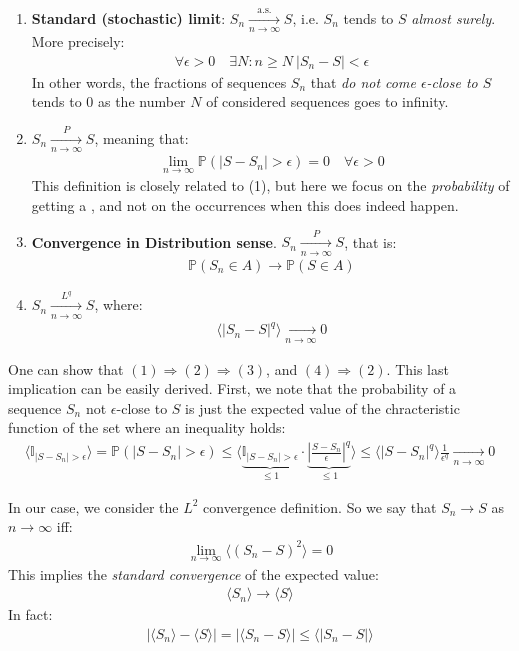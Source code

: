 \documentclass[../template.tex]{subfiles}
\begin{document}
\begin{enumerate}
    \item \textbf{Standard (stochastic) limit}: $S_n  \xrightarrow[n \to \infty]{\mathrm{a.s.}}  S$, i.e. $S_n$ tends to $S$ \textit{almost surely}. More precisely:
    \begin{align*}
        \forall \epsilon > 0\quad \exists N \colon n \geq N \> |S_n - S| < \epsilon    
    \end{align*}     
    In other words, the fractions of sequences $S_n$ that \textit{do not come $\epsilon$-close to $S$} tends to $0$ as the number $N$ of considered sequences goes to infinity.
    \item $S_n  \xrightarrow[n \to \infty]{P} S$, meaning that:
    \begin{align*}
        \lim_{n \to \infty} \mathbb{P}(|S-S_n| > \epsilon) = 0 \quad \forall \epsilon > 0
    \end{align*}
    This definition is closely related to (1), but here we focus on the \textit{probability} of getting a , and not on the occurrences when this does indeed happen.
    \item \textbf{Convergence in Distribution sense}. $S_n  \xrightarrow[n \to \infty]{P}  S$, that is:
    \begin{align*}
        \mathbb{P}(S_n \in A) \to \mathbb{P}(S \in A)    
    \end{align*}  
    \item $S_n  \xrightarrow[n \to \infty]{L^q} S$, where:
    \begin{align*}
        \langle |S_n - S |^q \rangle  \xrightarrow[n \to \infty]{}  0
    \end{align*}       
\end{enumerate}
One can show that $(1) \Rightarrow (2) \Rightarrow (3)$, and $(4) \Rightarrow (2)$. This last implication can be easily derived. First, we note that the probability of a sequence $S_n$ not $\epsilon$-close to $S$ is just the expected value of the chracteristic function of the set where an inequality holds:
\begin{align*}
    \langle \mathbb{I}_{|S-S_n| > \epsilon} \rangle = \mathbb{P}(|S-S_n| > \epsilon) \leq \langle \underbrace{\mathbb{I}_{|S-S_n|>\epsilon}}_{\leq 1}  \cdot \underbrace{\left|\frac{S-S_n}{\epsilon}  \right|^q}_{\leq 1}  \rangle \leq \langle |S-S_n|^q \rangle \frac{1}{\epsilon^q}  \xrightarrow[n \to \infty]{} 0   
\end{align*}     

In our case, we consider the $L^2$ convergence definition. So we say that $S_n \to S$ as $n \to \infty$ iff:
\begin{align*}
    \lim_{n \to \infty} \langle (S_n - S)^2 \rangle = 0
\end{align*}   
This implies the \textit{standard convergence} of the expected value:
\begin{align*}
    \langle S_n \rangle \to \langle S \rangle
\end{align*} 
In fact:
\begin{align*}
    |\langle S_n \rangle - \langle S \rangle| = |\langle S_n - S \rangle| \leq \langle |S_n - S| \rangle
\end{align*}
\end{document}

